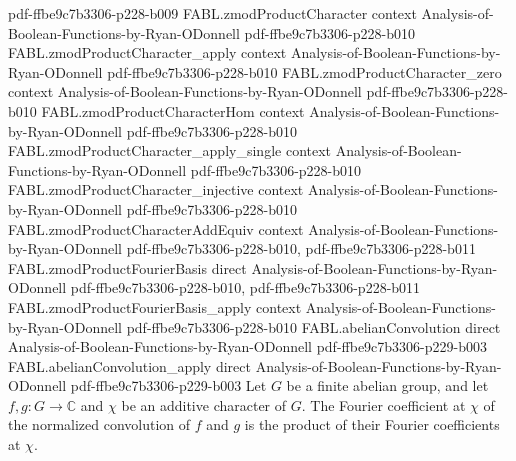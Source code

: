 \begin{theorem}
  {pdf-ffbe9c7b3306-p228-b009}
\proofstep
  {FABL.zmodProductCharacter}
  {context}
  {Analysis-of-Boolean-Functions-by-Ryan-ODonnell}
  {pdf-ffbe9c7b3306-p228-b010}
\proofstep
  {FABL.zmodProductCharacter_apply}
  {context}
  {Analysis-of-Boolean-Functions-by-Ryan-ODonnell}
  {pdf-ffbe9c7b3306-p228-b010}
\proofstep
  {FABL.zmodProductCharacter_zero}
  {context}
  {Analysis-of-Boolean-Functions-by-Ryan-ODonnell}
  {pdf-ffbe9c7b3306-p228-b010}
\proofstep
  {FABL.zmodProductCharacterHom}
  {context}
  {Analysis-of-Boolean-Functions-by-Ryan-ODonnell}
  {pdf-ffbe9c7b3306-p228-b010}
\proofstep
  {FABL.zmodProductCharacter_apply_single}
  {context}
  {Analysis-of-Boolean-Functions-by-Ryan-ODonnell}
  {pdf-ffbe9c7b3306-p228-b010}
\proofstep
  {FABL.zmodProductCharacter_injective}
  {context}
  {Analysis-of-Boolean-Functions-by-Ryan-ODonnell}
  {pdf-ffbe9c7b3306-p228-b010}
\proofstep
  {FABL.zmodProductCharacterAddEquiv}
  {context}
  {Analysis-of-Boolean-Functions-by-Ryan-ODonnell}
  {pdf-ffbe9c7b3306-p228-b010,
    pdf-ffbe9c7b3306-p228-b011}
\proofstep
  {FABL.zmodProductFourierBasis}
  {direct}
  {Analysis-of-Boolean-Functions-by-Ryan-ODonnell}
  {pdf-ffbe9c7b3306-p228-b010,
    pdf-ffbe9c7b3306-p228-b011}
\proofstep
  {FABL.zmodProductFourierBasis_apply}
  {context}
  {Analysis-of-Boolean-Functions-by-Ryan-ODonnell}
  {pdf-ffbe9c7b3306-p228-b010}
\proofstep
  {FABL.abelianConvolution}
  {direct}
  {Analysis-of-Boolean-Functions-by-Ryan-ODonnell}
  {pdf-ffbe9c7b3306-p229-b003}
\proofstep
  {FABL.abelianConvolution_apply}
  {direct}
  {Analysis-of-Boolean-Functions-by-Ryan-ODonnell}
  {pdf-ffbe9c7b3306-p229-b003}
Let $G$ be a finite abelian group, and let $f,g:G\to\mathbb{C}$ and $\chi$ be an
additive character of $G$. The Fourier coefficient at $\chi$ of the normalized
convolution of $f$ and $g$ is the product of their Fourier coefficients at $\chi$.
\end{theorem}
